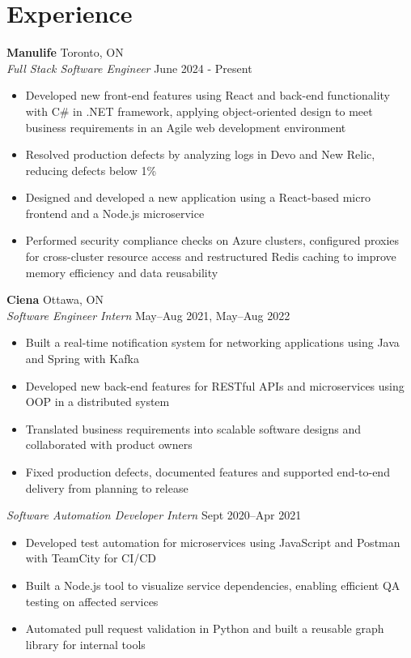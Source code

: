 \documentclass[a4paper,10pt]{article}
\begin{document}
\vspace{0.2em}

\section*{Experience}

\textbf{Manulife} \hfill Toronto, ON \\
\textit{Full Stack Software Engineer} \hfill June 2024 - Present
\begin{itemize}[itemsep=2pt]
    \item Developed new front-end features using React and back-end functionality with C\# in .NET framework, applying object-oriented design to meet business requirements in an Agile web development environment
    \item Resolved production defects by analyzing logs in Devo and New Relic, reducing defects below 1\%
    \item Designed and developed a new application using a React-based micro frontend and a Node.js microservice
    \item Performed security compliance checks on Azure clusters, configured proxies for cross-cluster resource access and restructured Redis caching to improve memory efficiency and data reusability
\end{itemize}

\textbf{Ciena} \hfill Ottawa, ON \\
\textit{Software Engineer Intern} \hfill May–Aug 2021, May–Aug 2022
\begin{itemize}[itemsep=2pt]
    \item Built a real-time notification system for networking applications using Java and Spring with Kafka
    \item Developed new back-end features for RESTful APIs and microservices using OOP in a distributed system
    \item Translated business requirements into scalable software designs and collaborated with product owners
    \item Fixed production defects, documented features and supported end-to-end delivery from planning to release
\end{itemize}

\textit{Software Automation Developer Intern} \hfill Sept 2020–Apr 2021
\begin{itemize}[itemsep=2pt]
    \item Developed test automation for microservices using JavaScript and Postman with TeamCity for CI/CD
    \item Built a Node.js tool to visualize service dependencies, enabling efficient QA testing on affected services
    \item Automated pull request validation in Python and built a reusable graph library for internal tools
\end{itemize}
\end{document}
